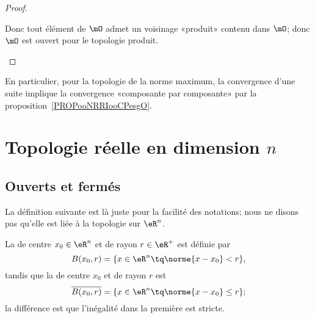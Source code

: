 \begin{proof}
\begin{subproof}
\begin{subproof}
            Donc tout élément de \( \mO\) admet un voisinage «produit» contenu dans \( \mO\); donc \( \mO\) est ouvert pour le topologie produit.
    \end{subproof}
    \end{subproof}
\end{proof}

\begin{normaltext}
    En particulier, pour la topologie de la norme maximum, la convergence d'une suite implique la convergence «composante par composante» par la proposition~\ref{PROPooNRRIooCPesgO}.
\end{normaltext}


\section{Topologie réelle en dimension $n$}

\subsection{Ouverts et fermés}

La définition suivante est là juste pour la facilité des notations; nous ne disons pas qu'elle est liée à la topologie sur \( \eR^n\).
\begin{definition}  \label{DefZVuBbqp}
	La  de centre $x_0 \in \eR^n$ et de rayon $r \in
	\eR^+$ est définie par
	\begin{equation}
		B(x_0,r) = \{ x \in \eR^n \tq \norme{x - x_0} < r \},
	\end{equation}
	tandis que la  de centre $x_0$ et de rayon $r$ est
	\begin{equation}
        \overline{  B(x_0,r)} = \{ x \in \eR^n \tq \norme{x - x_0} \leq r \};
	\end{equation}
	la différence est que l'inégalité dans la première est stricte.
\end{definition}

